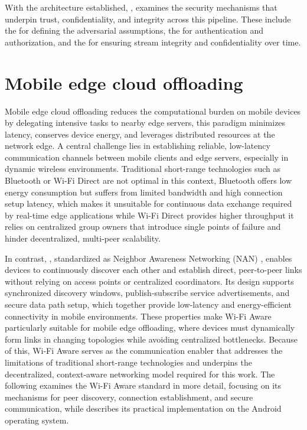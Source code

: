 \quad With the architecture established, \textbf{}, examines the security mechanisms that underpin trust, confidentiality, and integrity across this pipeline. These include the \textbf{} for defining the adversarial assumptions, the \textbf{} for authentication and authorization, and the \textbf{} for ensuring stream integrity and confidentiality over time.



\section{Mobile edge cloud offloading}
\label{sec:mobile edge cloud offloading}

\quad Mobile edge cloud offloading reduces the computational burden on mobile devices by delegating intensive tasks to nearby edge servers, this paradigm minimizes latency, conserves device energy, and leverages distributed resources at the network edge. A central challenge lies in establishing reliable, low-latency communication channels between mobile clients and edge servers, especially in dynamic wireless environments. Traditional short-range technologies such as Bluetooth or Wi-Fi Direct are not optimal in this context, Bluetooth offers low energy consumption but suffers from limited bandwidth and high connection setup latency, which makes it unsuitable for continuous data exchange required by real-time edge applications while Wi-Fi Direct provides higher throughput it relies on centralized group owners that introduce single points of failure and hinder decentralized, multi-peer scalability. 

\quad In contrast, \textbf{}, standardized as Neighbor Awareness Networking (NAN) \cite{wifi_aware_specification}, enables devices to continuously discover each other and establish direct, peer-to-peer links without relying on access points or centralized coordinators. Its design supports synchronized discovery windows, publish-subscribe service advertisements, and secure data path setup, which together provide low-latency and energy-efficient connectivity in mobile environments. These properties make Wi-Fi Aware particularly suitable for mobile edge offloading, where devices must dynamically form links in changing topologies while avoiding centralized bottlenecks. Because of this, Wi-Fi Aware serves as the communication enabler that addresses the limitations of traditional short-range technologies and underpins the decentralized, context-aware networking model required for this work. The following \textbf{} examines the Wi-Fi Aware standard in more detail, focusing on its mechanisms for peer discovery, connection establishment, and secure communication, while \textbf{} describes its practical implementation on the Android operating system.

